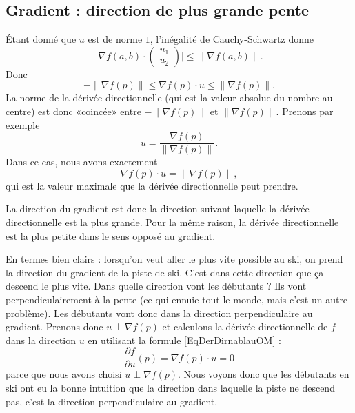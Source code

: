 \subsection{Gradient : direction de plus grande pente}

Étant donné que $u$ est de norme $1$, l'inégalité de Cauchy-Schwartz donne
\begin{equation}
    \big| \nabla f(a,b)\cdot \begin{pmatrix}
        u_1    \\ 
        u_2    
    \end{pmatrix}\big|\leq \| \nabla f(a,b) \|.
\end{equation}
Donc
\begin{equation}
    -\| \nabla f(p) \|\leq \nabla f(p)\cdot u\leq\| \nabla f(p) \|.
\end{equation}
La norme de la dérivée directionnelle (qui est la valeur absolue du nombre au centre) est donc «coincée» entre $-\| \nabla f(p) \|$ et $\| \nabla f(p) \|$. Prenons par exemple
\begin{equation}
    u=\frac{ \nabla f(p) }{ \| \nabla f(p) \| }.
\end{equation}
Dans ce cas, nous avons exactement
\begin{equation}
    \nabla f(p)\cdot u=\| \nabla f(p) \|,
\end{equation}
qui est la valeur maximale que la dérivée directionnelle peut prendre.

La direction du gradient est donc la direction suivant laquelle la dérivée directionnelle est la plus grande. Pour la même raison, la dérivée directionnelle est la plus petite dans le sens opposé au gradient.

En termes bien clairs : lorsqu'on veut aller le plus vite possible au ski, on prend la direction du gradient de la piste de ski. C'est dans cette direction que ça descend le plus vite. Dans quelle direction vont les débutants ? Ils vont perpendiculairement à la pente (ce qui ennuie tout le monde, mais c'est un autre problème). Les débutants vont donc dans la direction perpendiculaire au gradient. Prenons donc $u\perp \nabla f(p)$ et calculons la dérivée directionnelle de $f$ dans la direction $u$ en utilisant la formule \ref{EqDerDirnablauOM} :
\begin{equation}
    \frac{ \partial f }{ \partial u }(p)=\nabla f(p)\cdot u=0
\end{equation}
parce que nous avons choisi $u\perp \nabla f(p)$. Nous voyons donc que les débutants en ski ont eu la bonne intuition que la direction dans laquelle la piste ne descend pas, c'est la direction perpendiculaire au gradient.

